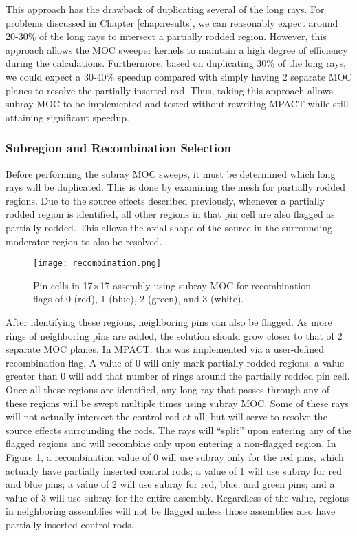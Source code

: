 This approach has the drawback of duplicating several of the long rays.  For problems discussed in Chapter \ref{chap:results}, we can reasonably expect around 20-30\% of the long rays to intersect a partially rodded region.  However, this approach allows the MOC sweeper kernels to maintain a high degree of efficiency during the calculations.  Furthermore, based on duplicating 30\% of the long rays, we could expect a 30-40\% speedup compared with simply having 2 separate MOC planes to resolve the partially inserted rod.  Thus, taking this approach allows subray MOC to be implemented and tested without rewriting MPACT while still attaining significant speedup.

\subsubsection{Subregion and Recombination Selection}\label{sss:recombination}

Before performing the subray MOC sweeps, it must be determined which long rays will be duplicated.  This is done by examining the mesh for partially rodded regions.  Due to the source effects described previously, whenever a partially rodded region is identified, all other regions in that pin cell are also flagged as partially rodded.  This allows the axial shape of the source in the surrounding moderator region to also be resolved.

\begin{figure}[h]
    \centering
    \texttt{[image: recombination.png]}
    \caption{Pin cells in 17$\times$17 assembly using subray MOC for recombination flags of 0 (red), 1 (blue), 2 (green), and 3 (white).}\label{f:recombination}
\end{figure}

After identifying these regions, neighboring pins can also be flagged.  As more rings of neighboring pins are added, the solution should grow closer to that of 2 separate MOC planes.  In MPACT, this was implemented via a user-defined recombination flag.  A value of 0 will only mark partially rodded regions; a value greater than 0 will add that number of rings around the partially rodded pin cell.  Once all these regions are identified, any long ray that passes through any of these regions will be swept multiple times using subray MOC.  Some of these rays will not actually intersect the control rod at all, but will serve to resolve the source effects surrounding the rods.  The rays will ``split'' upon entering any of the flagged regions and will recombine only upon entering a non-flagged region.  In Figure \ref{f:recombination}, a recombination value of 0 will use subray only for the red pins, which actually have partially inserted control rods; a value of 1 will use subray for red and blue pins; a value of 2 will use subray for red, blue, and green pins; and a value of 3 will use subray for the entire assembly.  Regardless of the value, regions in neighboring assemblies will not be flagged unless those assemblies also have partially inserted control rods.

